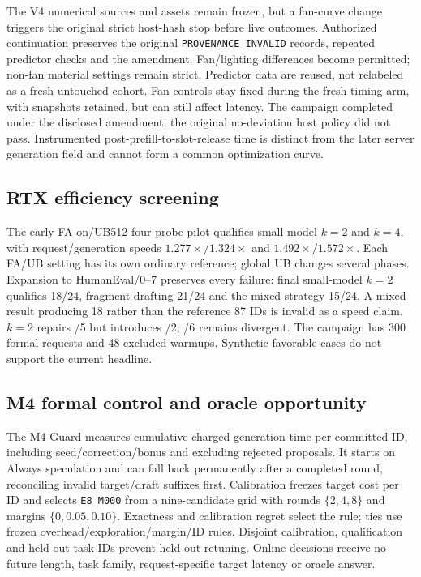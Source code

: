 The V4 numerical sources and assets remain frozen, but a fan-curve change triggers the original strict host-hash stop before live outcomes. Authorized continuation preserves the original \texttt{PROVENANCE\_INVALID} records, repeated predictor checks and the amendment. Fan/lighting differences become permitted; non-fan material settings remain strict. Predictor data are reused, not relabeled as a fresh untouched cohort. Fan controls stay fixed during the fresh timing arm, with snapshots retained, but can still affect latency. The campaign completed under the disclosed amendment; the original no-deviation host policy did not pass. Instrumented post-prefill-to-slot-release time is distinct from the later server generation field and cannot form a common optimization curve.

\subsection{RTX efficiency screening}
\label{supp:rtx_efficiency_pilot}
The early FA-on/UB512 four-probe pilot qualifies small-model $k=2$ and $k=4$, with request/generation speeds $1.277\times/1.324\times$ and $1.492\times/1.572\times$. Each FA/UB setting has its own ordinary reference; global UB changes several phases. Expansion to HumanEval/0--7 preserves every failure: final small-model $k=2$ qualifies 18/24, fragment drafting 21/24 and the mixed strategy 15/24. A mixed result producing 18 rather than the reference 87 IDs is invalid as a speed claim. $k=2$ repairs /5 but introduces /2; /6 remains divergent. The campaign has 300 formal requests and 48 excluded warmups. Synthetic favorable cases do not support the current headline.

\subsection{M4 formal control and oracle opportunity}
\label{supp:m4_control}
The M4 Guard measures cumulative charged generation time per committed ID, including seed/correction/bonus and excluding rejected proposals. It starts on Always speculation and can fall back permanently after a completed round, reconciling invalid target/draft suffixes first. Calibration freezes target cost per ID and selects \texttt{E8\_M000} from a nine-candidate grid with rounds $\{2,4,8\}$ and margins $\{0,0.05,0.10\}$. Exactness and calibration regret select the rule; ties use frozen overhead/exploration/margin/ID rules. Disjoint calibration, qualification and held-out task IDs prevent held-out retuning. Online decisions receive no future length, task family, request-specific target latency or oracle answer.

